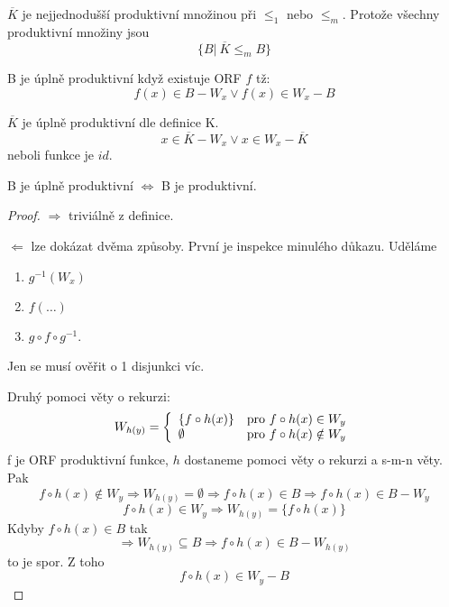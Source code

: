 \begin{consequence}
	$\overline{K}$ je nejjednodušší produktivní množinou při $\leq_1$ nebo $\leq_m$.
	Protože všechny produktivní množiny jsou
	\[ \{ B |\ \overline{K} \leq_m B \} \]
\end{consequence}

\begin{definition}
	B je úplně produktivní když existuje ORF $f$ tž:
	\[ f(x) \in B - W_x \lor f(x) \in W_x - B \]
\end{definition}

\begin{example}
	$\overline{K}$ je úplně produktivní dle definice K.
	\[ x \in \overline{K} - W_x \lor x \in W_x - \overline{K}\]
	neboli funkce je $id$.
\end{example}

\begin{theorem}
	B je úplně produktivní $\iff$ B je produktivní.
\end{theorem}
\begin{proof}
	$\Rightarrow$ triviálně z definice.

	$\Leftarrow$ lze dokázat dvěma způsoby.
	První je inspekce minulého důkazu.
	Uděláme
	\begin{enumerate}
		\item $g^{-1}(W_x)$
		\item $f(\ldots)$
		\item $g \circ f \circ g^{-1}$.
	\end{enumerate}
	Jen se musí ověřit o 1 disjunkci víc.

	Druhý pomoci věty o rekurzi:
	\[ W_{h(y)} = \left\{ \begin{array}{ll}  \{ f \circ h(x) \}  & \mbox{pro }  f \circ h(x) \in W_y  \\  \emptyset  & \mbox{pro }  f \circ h(x) \notin W_y  \end{array} \right. \]
	f je ORF produktivní funkce, $h$ dostaneme pomoci věty o rekurzi a s-m-n věty. Pak
	\[ f \circ h(x) \notin W_y \Rightarrow W_{h(y)} = \emptyset \Rightarrow f \circ h(x) \in B \Rightarrow f \circ h(x) \in B - W_y \]
	\[ f \circ h(x) \in W_y \Rightarrow W_{h(y)} = \{ f \circ h(x) \} \]
	Kdyby $f \circ h(x) \in B$ tak
	\[ \Rightarrow W_{h(y)} \subseteq B \Rightarrow f \circ h(x) \in B - W_{h(y)} \]
	to je spor.
	Z toho
	\[ f \circ h(x) \in W_y - B \]
\end{proof}

